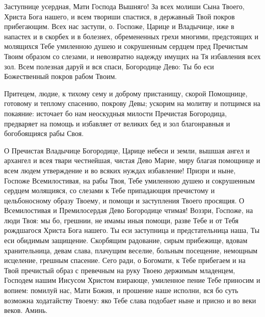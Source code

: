 \begin{mymulticols}



Заступнице усердная, Мати Господа Вышняго! За всех молиши Сына Твоего, Христа Бога нашего, и всем твориши спастися, в державный Твой покров прибегающим. Всех нас заступи, о. Госпоже, Царице и Владычице, иже в напастех и в скорбех и в болезнех, обремененных грехи многими, предстоящих и молящихся Тебе умиленною душею и сокрушенным сердцем пред Пречистым Твоим образом со слезами, и невозвратно надежду имущих на Тя избавления всех зол. Всем полезная даруй и вся спаси, Богородице Дево: Ты бо еси Божественный покров рабом Твоим.


Притецем, людие, к тихому сему и доброму пристанищу, скорой Помощнице, готовому и теплому спасению, покрову Девы; ускорим на молитву и потщимся на покаяние: источает бо нам неоскудныя милости Пречистая Богородица, предваряет на помощь и избавляет от великих бед и зол благонравныя и богобоящияся рабы Своя.


О Пречистая Владычице Богородице, Царице небеси и земли, вышшая ангел и архангел и всея твари честнейшая, чистая Дево Марие, миру благая помощнице и всем людем утверждение и во всяких нуждах избавление! Призри и ныне, Госпоже Всемилостивая, на рабы Твоя, Тебе умиленною душею и сокрушенным сердцем молящияся, со слезами к Тебе припадающия пречистому и цельбоносному образу Твоему, и помощи и заступления Твоего просящия. О Всемилостивая и Премилосердая Дево Богородице чтимая! Воззри, Госпоже, на люди Твоя: мы бо, грешнии, не имамы иныя помощи, разве Тебе и от Тебя рождшагося Христа Бога нашего. Ты еси заступница и предстательница наша, Ты еси обидимым защищение. Скорбящим радование, сирым прибежище, вдовам хранительница, девам слава, плачущим веселие, больным посещение, немощным исцеление, грешным спасение. Сего ради, о Богомати, к Тебе прибегаем и на Твой пречистый образ с превечным на руку Твоею держимым младенцем, Господем нашим Иисусом Христом взирающе, умиленное пение Тебе приносим и вопием: помилуй нас, Мати Божия, и прошение наше исполни, вся бо суть возможна ходатайству Твоему: яко Тебе слава подобает ныне и присно и во веки веков. Аминь.

\end{mymulticols}

